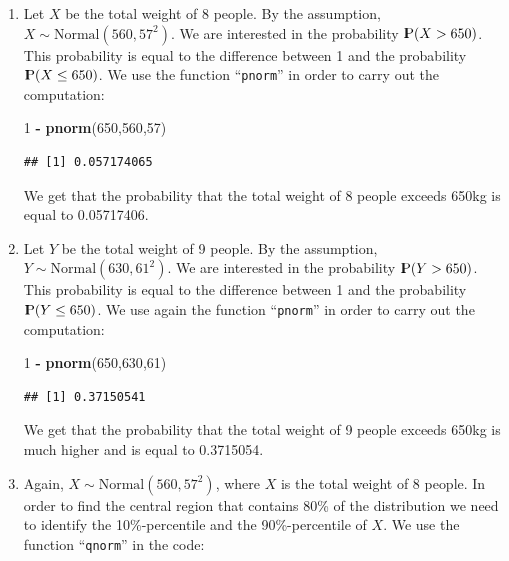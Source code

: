 \documentclass[]{krantz}
\makeatletter
\newenvironment{Shaded}{\begin{snugshade}}{\end{snugshade}}
\newcommand{\DecValTok}[1]{\textcolor[rgb]{0.00,0.00,0.81}{#1}}
\newcommand{\KeywordTok}[1]{\textcolor[rgb]{0.13,0.29,0.53}{\textbf{#1}}}
\newcommand{\NormalTok}[1]{#1}
\newcommand{\OperatorTok}[1]{\textcolor[rgb]{0.81,0.36,0.00}{\textbf{#1}}}
\newcommand{\StringTok}[1]{\textcolor[rgb]{0.31,0.60,0.02}{#1}}
\newcommand{\Prob}{{\rm I\kern-.3em P}}
\newenvironment{kframe}{%
\medskip{}
\setlength{\fboxsep}{.8em}
 \def\at@end@of@kframe{}%
 \ifinner\ifhmode%
  \def\at@end@of@kframe{\end{minipage}}%
  \begin{minipage}{\columnwidth}%
 \fi\fi%
 \def\FrameCommand##1{\hskip\@totalleftmargin \hskip-\fboxsep
 \colorbox{shadecolor}{##1}\hskip-\fboxsep
     \hskip-\linewidth \hskip-\@totalleftmargin \hskip\columnwidth}%
 \MakeFramed {\advance\hsize-\width
   \@totalleftmargin\z@ \linewidth\hsize
   \@setminipage}}%
 {\par\unskip\endMakeFramed%
 \at@end@of@kframe}
\renewenvironment{Shaded}{\begin{kframe}}{\end{kframe}}
\theoremstyle{definition}
\theoremstyle{definition}
\theoremstyle{definition}
\theoremstyle{remark}
\makeatother
\begin{document}
\begin{enumerate}
\def\labelenumi{\arabic{enumi}.}
\item
  Let \(X\) be the total weight of 8
  people. By the assumption, \(X \sim \mbox{Normal}(560, 57^2)\). We are
  interested in the probability \(\Prob(X > 650)\). This probability is
  equal to the difference between 1 and the probability
  \(\Prob(X \leq 650)\). We use the function ``\texttt{pnorm}'' in order to carry out
  the computation:

\begin{Shaded}
\begin{Highlighting}[]
\DecValTok{1} \OperatorTok{-}\StringTok{ }\KeywordTok{pnorm}\NormalTok{(}\DecValTok{650}\NormalTok{,}\DecValTok{560}\NormalTok{,}\DecValTok{57}\NormalTok{)}
\end{Highlighting}
\end{Shaded}

\begin{verbatim}
## [1] 0.057174065
\end{verbatim}

  We get that the probability that the total weight of 8 people exceeds
  650kg is equal to 0.05717406.
\item
  Let \(Y\) be the total weight of 9
  people. By the assumption, \(Y \sim \mbox{Normal}(630, 61^2)\). We are
  interested in the probability \(\Prob(Y > 650)\). This probability is
  equal to the difference between 1 and the probability
  \(\Prob(Y \leq 650)\). We use again the function ``\texttt{pnorm}'' in order to
  carry out the computation:

\begin{Shaded}
\begin{Highlighting}[]
\DecValTok{1} \OperatorTok{-}\StringTok{ }\KeywordTok{pnorm}\NormalTok{(}\DecValTok{650}\NormalTok{,}\DecValTok{630}\NormalTok{,}\DecValTok{61}\NormalTok{)}
\end{Highlighting}
\end{Shaded}

\begin{verbatim}
## [1] 0.37150541
\end{verbatim}

  We get that the probability that the total weight of 9 people exceeds
  650kg is much higher and is equal to 0.3715054.
\item
  Again,
  \(X \sim \mbox{Normal}(560, 57^2)\), where \(X\) is the total weight of 8
  people. In order to find the central region that contains 80\% of the
  distribution we need to identify the 10\%-percentile and the
  90\%-percentile of \(X\). We use the function ``\texttt{qnorm}'' in the code:


\end{enumerate}
\end{document}

